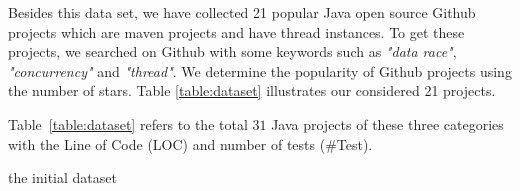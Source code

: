 Besides this data set, we have collected 21 popular Java open source Github
projects which are maven projects and have thread instances. To get these projects, we searched on Github with some keywords such as \textit{"data
race"}, \textit{"concurrency"} and \textit{"thread"}. We determine the popularity of Github projects using the number of stars. Table \ref{table:dataset}
illustrates our considered 21 projects.

Table~\ref{table:dataset} refers to the total $31$ Java projects of these three
categories with the Line of Code (LOC) and number of tests (\#Test).



\begin{table}
	\centering
	\caption{the initial dataset}
	\label{table:dataset}


\end{table}
